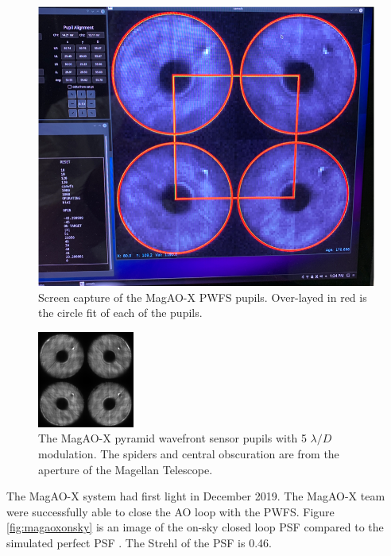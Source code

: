 \begin{figure}
    \centering
    \includegraphics[width=.8\textwidth]{Chapter Materials/Chapter Five Materials/magaoxfitpupils.png}
    \caption{Screen capture of the MagAO-X PWFS pupils. Over-layed in red is the circle fit of each of the pupils. }
    \label{fig:fitPupils}
\end{figure}

\begin{figure}
    \centering
    \includegraphics[width=.5\textwidth]{Chapter Materials/Chapter Three Materials/MagAOXpupil5LD.png}
    \caption{The MagAO-X pyramid wavefront sensor pupils with 5 $\lambda/D$ modulation. The spiders and central obscuration are from the aperture of the Magellan Telescope.  }
    \label{fig:MagAOXpupils}
\end{figure}

The MagAO-X system had first light in December 2019. The MagAO-X team were successfully able to close the AO loop with the PWFS. Figure \ref{fig:magaoxonsky} is an image of the on-sky closed loop PSF compared to the simulated perfect PSF \citep{males2020magao}. The Strehl of the PSF is 0.46. 

